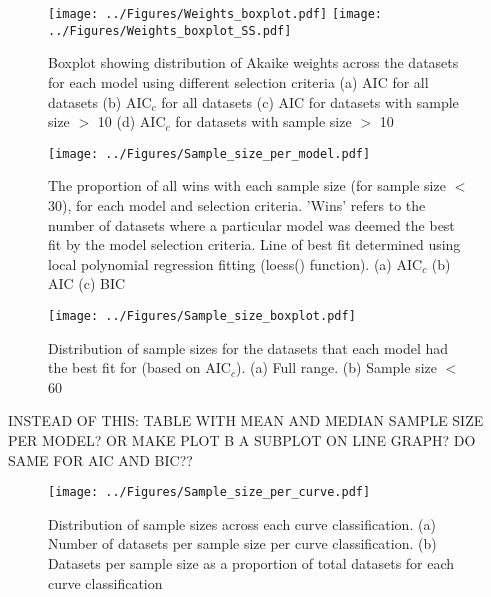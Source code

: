 \documentclass[11pt]{article}
\begin{document}
\begin{figure} [H]
	\texttt{[image: ../Figures/Weights\_boxplot.pdf]}
	\texttt{[image: ../Figures/Weights\_boxplot\_SS.pdf]}
	\caption{\label{fig:weights} Boxplot showing distribution of Akaike weights across the datasets for each model using different selection criteria (a) AIC for all datasets (b) AIC$_c$ for all datasets (c) AIC for datasets with sample size $>$ 10 (d) AIC$_c$ for datasets with sample size $>$ 10}
\end{figure}


\begin{figure} [H]
	\texttt{[image: ../Figures/Sample\_size\_per\_model.pdf]}
	\caption{\label{fig:sample_size_line} The proportion of all wins with each sample size (for sample size $<$ 30), for each model and selection criteria. 'Wins' refers to the number of datasets where a particular model was deemed the best fit by the model selection criteria. Line of best fit determined using local polynomial regression fitting (loess() function). (a) AIC$_c$ (b) AIC (c) BIC}
\end{figure}

\begin{figure} [H]
	\texttt{[image: ../Figures/Sample\_size\_boxplot.pdf]}
	\caption{\label{fig:sample_size_box} Distribution of sample sizes for the datasets that each model had the best fit for (based on AIC$_c$). (a) Full range. (b) Sample size $<$ 60 }
\end{figure}

INSTEAD OF THIS: TABLE WITH MEAN AND MEDIAN SAMPLE SIZE PER MODEL? OR MAKE PLOT B A SUBPLOT ON LINE GRAPH? DO SAME FOR AIC AND BIC??
\begin{figure} [H]
	\texttt{[image: ../Figures/Sample\_size\_per\_curve.pdf]}
	\caption{\label{fig:sample_size_per_curve} Distribution of sample sizes across each curve classification. (a) Number of datasets per sample size per curve classification. (b) Datasets per sample size as a proportion of total datasets for each curve classification}
\end{figure}







\end{document}
